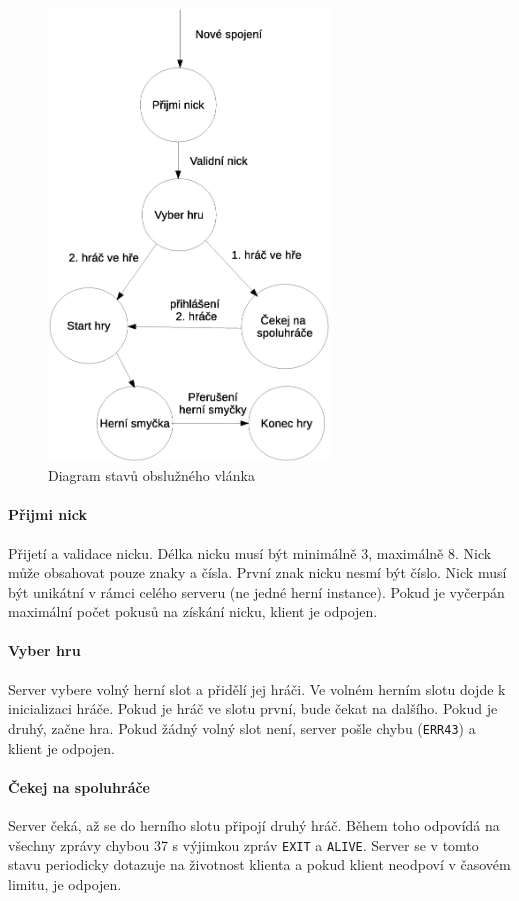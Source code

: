 \documentclass[11pt,a4paper]{scrartcl}
\begin{document}
	\begin{figure} [H]
		\centering
		\includegraphics[height=12cm]{obsluha.eps}
		\caption{Diagram stavů obslužného vlánka}
	\end{figure}

	\paragraph{Přijmi nick}
	Přijetí a validace nicku. Délka nicku musí být minimálně 3, maximálně 8. Nick může obsahovat pouze znaky a čísla. První znak nicku nesmí být číslo. Nick musí být unikátní v rámci celého serveru (ne jedné herní instance). Pokud je vyčerpán maximální počet pokusů na získání nicku, klient je odpojen.
	
	\paragraph{Vyber hru}
	Server vybere volný herní slot a přidělí jej hráči. Ve volném herním slotu dojde k inicializaci hráče. Pokud je hráč ve slotu první, bude čekat na dalšího. Pokud je druhý, začne hra. Pokud žádný volný slot není, server pošle chybu (\verb|ERR43|) a klient je odpojen.

	\paragraph{Čekej na spoluhráče}	
	Server čeká, až se do herního slotu připojí druhý hráč. Během toho odpovídá na všechny zprávy chybou 37 s výjimkou zpráv \verb|EXIT| a \verb|ALIVE|. Server se v tomto stavu periodicky dotazuje na životnost klienta a pokud klient neodpoví v časovém limitu, je odpojen.
\end{document}
